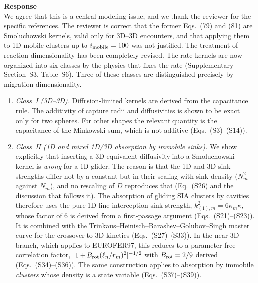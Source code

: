\documentclass{article}
\newcommand{\imob}{i_{\rm mobile}}
\begin{document}
\begin{itemize}
\textbf{Response}\\
We agree that this is a central modeling issue, and we thank the reviewer for the specific references. The reviewer is correct that the former Eqs.~(79) and (81) are Smoluchowski kernels, valid only for 3D--3D encounters, and that applying them to 1D-mobile clusters up to $\imob = 100$ was not justified. The treatment of reaction dimensionality has been completely revised. The rate kernels are now organized into six classes by the physics that fixes the rate (Supplementary Section~S3, Table~S6). Three of these classes are distinguished precisely by migration dimensionality.

\begin{enumerate}[label=(\alph*)]
\item \emph{Class~I (3D--3D).} Diffusion-limited kernels are derived from the capacitance rule. The additivity of capture radii and diffusivities is shown to be exact only for two spheres. For other shapes the relevant quantity is the capacitance of the Minkowski sum, which is not additive (Eqs.~(S3)--(S14)).

\item \emph{Class~II (1D and mixed 1D/3D absorption by immobile sinks).} We show explicitly that inserting a 3D-equivalent diffusivity into a Smoluchowski kernel is \emph{wrong} for a 1D glider. The reason is that the 1D and 3D sink strengths differ not by a constant but in their scaling with sink density ($N_m^2$ against $N_m$), and no rescaling of $D$ reproduces that (Eq.~(S26) and the discussion that follows it). The absorption of gliding SIA clusters by cavities therefore uses the pure-1D line-interception sink strength, $k^2_{(1),m}=6\kappa_m\kappa$, whose factor of 6 is derived from a first-passage argument (Eqs.~(S21)--(S23)). It is combined with the Trinkaus--Heinisch--Barashev--Golubov--Singh master curve for the crossover to 3D kinetics (Eqs.~(S27)--(S33)). In the near-3D branch, which applies to EUROFER97, this reduces to a parameter-free correlation factor, $[1+B_{\rm rot}(\ell_n/r_m)^2]^{-1/2}$ with $B_{\rm rot}=2/9$ derived (Eqs.~(S34)--(S36)). The same construction applies to absorption by immobile \emph{clusters} whose density is a state variable (Eqs.~(S37)--(S39)).


\end{enumerate}
\end{itemize}
\end{document}
